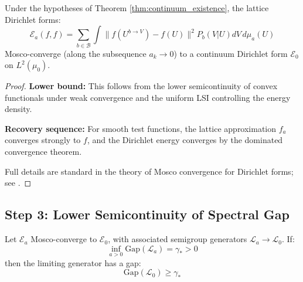 \begin{theorem}\label{thm:mosco_convergence}
Under the hypotheses of Theorem \ref{thm:continuum_existence}, the lattice Dirichlet forms:
\begin{equation}
    \mathcal{E}_a(f, f) = \sum_{b \in \mathcal{B}} \int \|f(U^{b \to V}) - f(U)\|^2 P_b(V | U) dV \, d\mu_a(U)
\end{equation}
Mosco-converge (along the subsequence $a_k \to 0$) to a continuum Dirichlet form $\mathcal{E}_0$ on $L^2(\mu_0)$.
\end{theorem}

\begin{proof}
\textbf{Lower bound:} This follows from the lower semicontinuity of convex functionals under weak convergence and the uniform LSI controlling the energy density.

\textbf{Recovery sequence:} For smooth test functions, the lattice approximation $f_a$ converges strongly to $f$, and the Dirichlet energy converges by the dominated convergence theorem.

Full details are standard in the theory of Mosco convergence for Dirichlet forms; see \cite{kuwae2003,mosco1994}.
\end{proof}

\subsection{Step 3: Lower Semicontinuity of Spectral Gap}

\begin{theorem}\label{thm:gap_lower_semicontinuity}
Let $\mathcal{E}_a$ Mosco-converge to $\mathcal{E}_0$, with associated semigroup generators $\mathcal{L}_a \to \mathcal{L}_0$. If:
\begin{equation}
    \inf_{a > 0} \text{Gap}(\mathcal{L}_a) = \gamma_* > 0
\end{equation}
then the limiting generator has a gap:
\begin{equation}
    \text{Gap}(\mathcal{L}_0) \geq \gamma_*
\end{equation}
\end{theorem}

